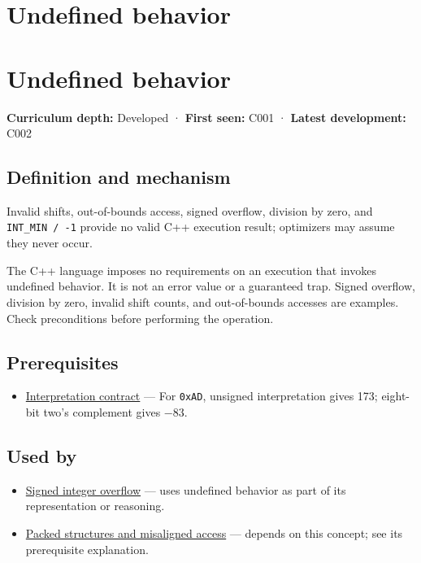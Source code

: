 \hypertarget{appendix-f558f5b4d8f2}{}
\section*{Undefined behavior}
\section{Undefined behavior}\label{undefined-behavior}

\textbf{Curriculum depth:} Developed · \textbf{First seen:} C001 · \textbf{Latest development:} C002

\subsection{Definition and mechanism}\label{definition-and-mechanism}

Invalid shifts, out-of-bounds access, signed overflow, division by zero, and \texttt{INT\_MIN\ /\ -1} provide no valid C++ execution result; optimizers may assume they never occur.

The C++ language imposes no requirements on an execution that invokes undefined behavior. It is not an error value or a guaranteed trap. Signed overflow, division by zero, invalid shift counts, and out-of-bounds accesses are examples. Check preconditions before performing the operation.

\subsection{Prerequisites}\label{prerequisites}

\begin{itemize}
\tightlist
\item
  \hyperref[appendix-f414bd4ed05c]{Interpretation contract} --- For \texttt{0xAD}, unsigned interpretation gives 173; eight-bit two's complement gives −83.
\end{itemize}

\subsection{Used by}\label{used-by}

\begin{itemize}
\item
  \hyperref[appendix-1a599c924a4e]{Signed integer overflow} --- uses undefined behavior as part of its representation or reasoning.
\item
  \hyperref[appendix-0682dbfc5f0e]{Packed structures and misaligned access} --- depends on this concept; see its prerequisite explanation.
\end{itemize}

